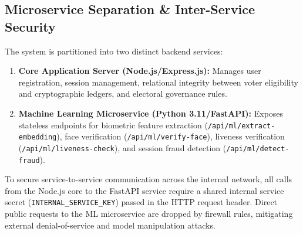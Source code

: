 \documentclass[conference]{IEEEtran}
\begin{document}
\subsection{Microservice Separation \& Inter-Service Security}
The system is partitioned into two distinct backend services:
\begin{enumerate}
    \item \textbf{Core Application Server (Node.js/Express.js):} Manages user registration, session management, relational integrity between voter eligibility and cryptographic ledgers, and electoral governance rules.
    \item \textbf{Machine Learning Microservice (Python 3.11/FastAPI):} Exposes stateless endpoints for biometric feature extraction (\texttt{/api/ml/extract-embedding}), face verification (\texttt{/api/ml/verify-face}), liveness verification (\texttt{/api/ml/liveness-check}), and session fraud detection (\texttt{/api/ml/detect-fraud}).
\end{enumerate}

To secure service-to-service communication across the internal network, all calls from the Node.js core to the FastAPI service require a shared internal service secret (\texttt{INTERNAL\_SERVICE\_KEY}) passed in the HTTP request header. Direct public requests to the ML microservice are dropped by firewall rules, mitigating external denial-of-service and model manipulation attacks.
\end{document}
